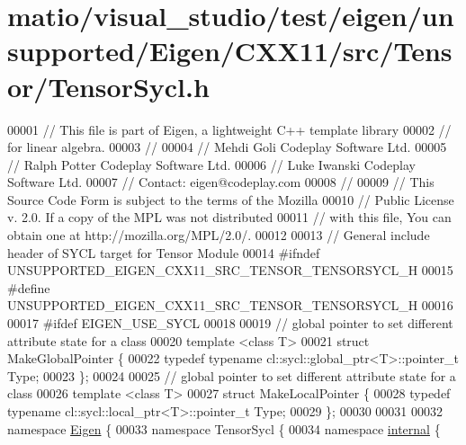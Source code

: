 \hypertarget{matio_2visual__studio_2test_2eigen_2unsupported_2_eigen_2_c_x_x11_2src_2_tensor_2_tensor_sycl_8h_source}{}\section{matio/visual\+\_\+studio/test/eigen/unsupported/\+Eigen/\+C\+X\+X11/src/\+Tensor/\+Tensor\+Sycl.h}
\label{matio_2visual__studio_2test_2eigen_2unsupported_2_eigen_2_c_x_x11_2src_2_tensor_2_tensor_sycl_8h_source}

\begin{DoxyCode}
00001 \textcolor{comment}{// This file is part of Eigen, a lightweight C++ template library}
00002 \textcolor{comment}{// for linear algebra.}
00003 \textcolor{comment}{//}
00004 \textcolor{comment}{// Mehdi Goli    Codeplay Software Ltd.}
00005 \textcolor{comment}{// Ralph Potter  Codeplay Software Ltd.}
00006 \textcolor{comment}{// Luke Iwanski  Codeplay Software Ltd.}
00007 \textcolor{comment}{// Contact: eigen@codeplay.com}
00008 \textcolor{comment}{//}
00009 \textcolor{comment}{// This Source Code Form is subject to the terms of the Mozilla}
00010 \textcolor{comment}{// Public License v. 2.0. If a copy of the MPL was not distributed}
00011 \textcolor{comment}{// with this file, You can obtain one at http://mozilla.org/MPL/2.0/.}
00012 
00013 \textcolor{comment}{// General include header of SYCL target for Tensor Module}
00014 \textcolor{preprocessor}{#ifndef UNSUPPORTED\_EIGEN\_CXX11\_SRC\_TENSOR\_TENSORSYCL\_H}
00015 \textcolor{preprocessor}{#define UNSUPPORTED\_EIGEN\_CXX11\_SRC\_TENSOR\_TENSORSYCL\_H}
00016 
00017 \textcolor{preprocessor}{#ifdef EIGEN\_USE\_SYCL}
00018 
00019 \textcolor{comment}{// global pointer to set different attribute state for a class}
00020 \textcolor{keyword}{template} <\textcolor{keyword}{class} T>
00021 \textcolor{keyword}{struct }MakeGlobalPointer \{
00022   \textcolor{keyword}{typedef} \textcolor{keyword}{typename} cl::sycl::global\_ptr<T>::pointer\_t Type;
00023 \};
00024 
00025 \textcolor{comment}{// global pointer to set different attribute state for a class}
00026 \textcolor{keyword}{template} <\textcolor{keyword}{class} T>
00027 \textcolor{keyword}{struct }MakeLocalPointer \{
00028   \textcolor{keyword}{typedef} \textcolor{keyword}{typename} cl::sycl::local\_ptr<T>::pointer\_t Type;
00029 \};
00030 
00031 
00032 \textcolor{keyword}{namespace }\hyperlink{namespace_eigen}{Eigen} \{
00033 \textcolor{keyword}{namespace }TensorSycl \{
00034 \textcolor{keyword}{namespace }\hyperlink{namespaceinternal}{internal} \{

\end{DoxyCode}
